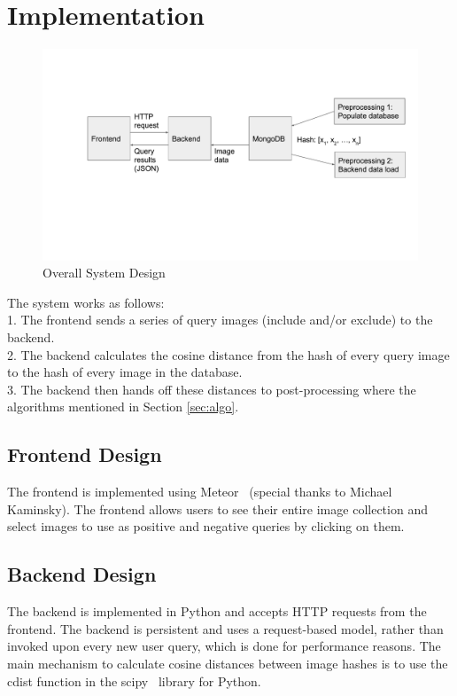 
\section{Implementation}
\begin{figure}[t]
    \begin{minipage}{1.0\columnwidth}
        \centering
        \includegraphics[width=0.9\columnwidth]{figs/system-design}
    \end{minipage}
    \caption{Overall System Design}
    \label{fig:system-design}
\end{figure}
The system works as follows:\\
    1. The frontend sends a series of query images (include and/or exclude) to the backend. \\
    2. The backend calculates the cosine distance from the hash of every query image to the hash of every image in the database. \\
    3. The backend then hands off these distances to post-processing where the algorithms mentioned in Section \ref{sec:algo}.

\subsection{Frontend Design}
The frontend is implemented using Meteor~\cite{coleman2015discover} (special thanks to Michael Kaminsky).
The frontend allows users to see their entire image collection and select images to use as positive
and negative queries by clicking on them.

\subsection{Backend Design}
The backend is implemented in Python and accepts HTTP requests from the frontend.
The backend is persistent and uses a request-based model, rather than invoked upon every new user query,
which is done for performance reasons.
The main mechanism to calculate cosine distances between image hashes is to use the cdist function in the
scipy~\cite{jones2001open} library for Python.

